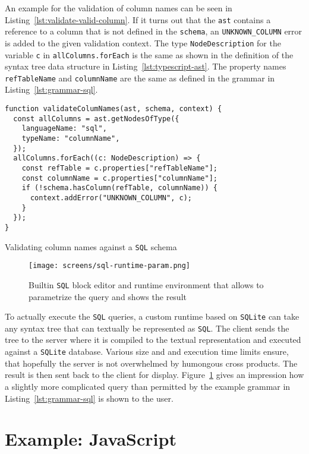 \documentclass[sigconf,natbib=false]{acmart}
\begin{document}
An example for the validation of column names can be seen in Listing~\ref{lst:validate-valid-column}. If it turns out that the \texttt{ast} contains a reference to a column that is not defined in the \texttt{schema}, an \texttt{UNKNOWN\_COLUMN} error is added to the given validation context. The type \texttt{NodeDescription} for the variable \texttt{c} in \texttt{allColumns.forEach} is the same as shown in the definition of the syntax tree data structure in Listing~\ref{lst:typescript-ast}. The property names \texttt{refTableName} and \texttt{columnName} are the same as defined in the grammar in Listing~\ref{lst:grammar-sql}.

\begin{listing}[H]
\begin{verbatim}
function validateColumNames(ast, schema, context) {
  const allColumns = ast.getNodesOfType({
    languageName: "sql",
    typeName: "columnName",
  });
  allColumns.forEach((c: NodeDescription) => {
    const refTable = c.properties["refTableName"];
    const columnName = c.properties["columnName"];
    if (!schema.hasColumn(refTable, columnName)) {
      context.addError("UNKNOWN_COLUMN", c);
    }
  });
}
\end{verbatim}
\caption{Validating column names against a \texttt{SQL} schema}
\label{lst:validate-valid-column}
\end{listing}

\begin{figure}
  \texttt{[image: screens/sql-runtime-param.png]}
  \caption{Builtin \texttt{SQL} block editor and runtime environment that allows to parametrize the query and shows the result}
  \label{fig:sql-runtime}
\end{figure}

To actually execute the \texttt{SQL} queries, a custom runtime based on \texttt{SQLite} can take any syntax tree that can textually be represented as \texttt{SQL}. The client sends the tree to the server where it is compiled to the textual representation and executed against a \texttt{SQLite} database. Various size and and execution time limits ensure, that hopefully the server is not overwhelmed by humongous cross products. The result is then sent back to the client for display. Figure~\ref{fig:sql-runtime} gives an impression how a slightly more complicated query than permitted by the example grammar in Listing~\ref{lst:grammar-sql} is shown to the user.

\section{Example: JavaScript}
\end{document}
